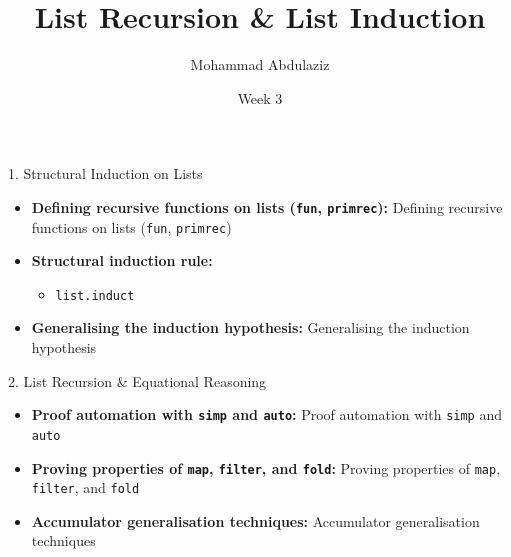 \documentclass[compress,10pt,xcolor=dvipsnames]{beamer}
\title[List Recursion & List Induction]{List Recursion & List Induction}
\author[7CCSACTP]{Mohammad Abdulaziz}
\date{Week 3}
\begin{document}

\begin{frame}{1. Structural Induction on Lists}

\begin{itemize}
  \item \textbf{Defining recursive functions on lists (\texttt{fun}, \texttt{primrec}):} Defining recursive functions on lists (\texttt{fun}, \texttt{primrec})
  \item \textbf{Structural induction rule:}
    \begin{itemize}
      \item \texttt{list.induct}
    \end{itemize}
  \item \textbf{Generalising the induction hypothesis:} Generalising the induction hypothesis
\end{itemize}
\end{frame}

\begin{frame}{2. List Recursion & Equational Reasoning}

\begin{itemize}
  \item \textbf{Proof automation with \texttt{simp} and \texttt{auto}:} Proof automation with \texttt{simp} and \texttt{auto}
  \item \textbf{Proving properties of \texttt{map}, \texttt{filter}, and \texttt{fold}:} Proving properties of \texttt{map}, \texttt{filter}, and \texttt{fold}
  \item \textbf{Accumulator generalisation techniques:} Accumulator generalisation techniques
\end{itemize}
\end{frame}
\end{document}
